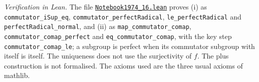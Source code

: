 \emph{Verification in Lean.} The file \href{\leanblobmain/Notebook1974_16.lean}{\texttt{Notebook1974\_16.\allowbreak{}lean}} proves (i) as \texttt{commutator\_iSup\_eq}, \texttt{commutator\_perfectRadical}, \texttt{le\_perfectRadical} and \texttt{perfectRadical\_normal}, and (ii) as \texttt{map\_commutator\_comap}, \texttt{commutator\_comap\_perfect} and \texttt{eq\_commutator\_comap}, with the key step \texttt{commutator\_comap\_le}; a subgroup is perfect when its commutator subgroup with itself is itself. The uniqueness does not use the surjectivity of $f$. The plus construction is not formalised. The axioms used are the three usual axioms of mathlib.

